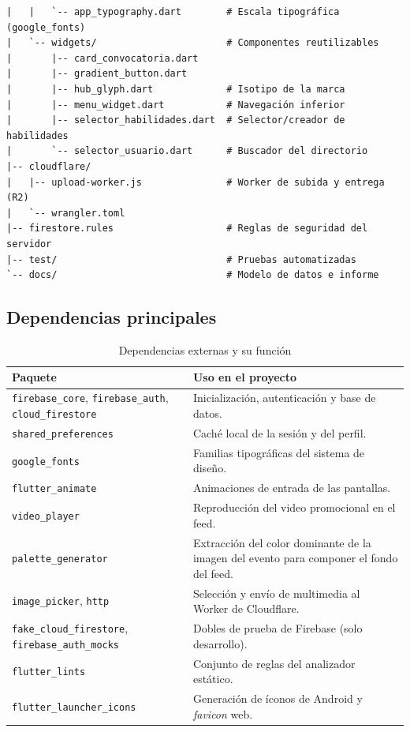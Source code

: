 \documentclass[12pt,a4paper]{article}
\begin{document}
{\begin{verbatim}
|   |   `-- app_typography.dart        # Escala tipográfica (google_fonts)
|   `-- widgets/                       # Componentes reutilizables
|       |-- card_convocatoria.dart
|       |-- gradient_button.dart
|       |-- hub_glyph.dart             # Isotipo de la marca
|       |-- menu_widget.dart           # Navegación inferior
|       |-- selector_habilidades.dart  # Selector/creador de habilidades
|       `-- selector_usuario.dart      # Buscador del directorio
|-- cloudflare/
|   |-- upload-worker.js               # Worker de subida y entrega (R2)
|   `-- wrangler.toml
|-- firestore.rules                    # Reglas de seguridad del servidor
|-- test/                              # Pruebas automatizadas
`-- docs/                              # Modelo de datos e informe
\end{verbatim}
}

\subsection{Dependencias principales}
\begin{table}[htbp]
\centering
\caption{Dependencias externas y su función}
\begin{tabular}{L{4.3cm}L{9.3cm}}
\toprule
\textbf{Paquete} & \textbf{Uso en el proyecto} \\
\midrule
\texttt{firebase\_core}, \texttt{firebase\_auth}, \texttt{cloud\_firestore} & Inicialización, autenticación y base de datos. \\
\texttt{shared\_preferences} & Caché local de la sesión y del perfil. \\
\texttt{google\_fonts} & Familias tipográficas del sistema de diseño. \\
\texttt{flutter\_animate} & Animaciones de entrada de las pantallas. \\
\texttt{video\_player} & Reproducción del video promocional en el feed. \\
\texttt{palette\_generator} & Extracción del color dominante de la imagen del evento para componer el fondo del feed. \\
\texttt{image\_picker}, \texttt{http} & Selección y envío de multimedia al Worker de Cloudflare. \\
\texttt{fake\_cloud\_firestore}, \texttt{firebase\_auth\_mocks} & Dobles de prueba de Firebase (solo desarrollo). \\
\texttt{flutter\_lints} & Conjunto de reglas del analizador estático. \\
\texttt{flutter\_launcher\_icons} & Generación de íconos de Android y \emph{favicon} web. \\
\bottomrule
\end{tabular}
\end{table}
\end{document}
